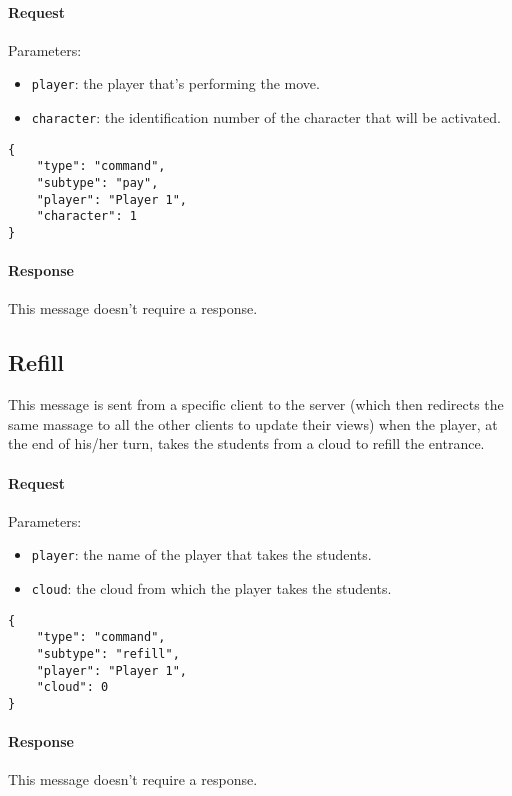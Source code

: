 \documentclass[a4paper]{article}
\begin{document}
	\paragraph{Request} Parameters:

	\begin{itemize}
		\item \verb|player|: the player that's performing the move.
		\item \verb|character|: the identification number of the character that will be activated.
	\end{itemize}

	\begin{verbatim}
{
	"type": "command",
	"subtype": "pay",
	"player": "Player 1",
	"character": 1
}
	\end{verbatim}

	\paragraph{Response} This message doesn't require a response.

	\subsection{Refill}

	This message is sent from a specific client to the server (which then redirects the same massage to all the other clients to update their views) when the player, at the end of his/her turn, takes the students from a cloud to refill the entrance.

	\paragraph{Request} Parameters:

	\begin{itemize}
		\item \verb|player|: the name of the player that takes the students.
		\item \verb|cloud|: the cloud from which the player takes the students.
	\end{itemize}

	\begin{verbatim}
{
	"type": "command",
	"subtype": "refill",
	"player": "Player 1",
	"cloud": 0
}
	\end{verbatim}

	\paragraph{Response} This message doesn't require a response.
\end{document}
